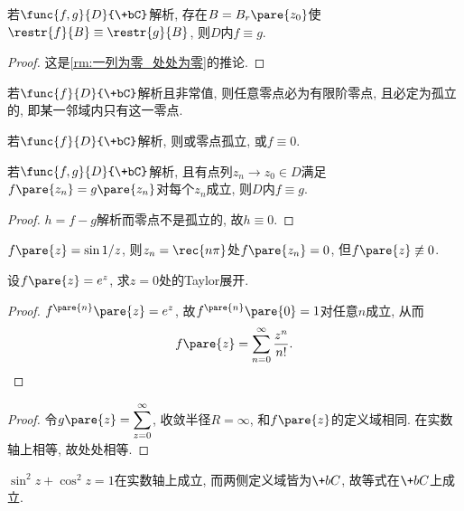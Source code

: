 \documentclass[../ComplexVariable.tex]{subfiles}
\begin{document}
\begin{corollary}
    若$\func{f,g}{D}{\+bC}$解析, 存在$B=B_r\pare{z_0}$使$\restr{f}{B} \equiv \restr{g}{B}$, 则$D$内$f\equiv g$.
\end{corollary}
\begin{proof}
    这是\cref{rm:一列为零_处处为零}的推论.
\end{proof}
\begin{corollary}
    若$\func{f}{D}{\+bC}$解析且非常值, 则任意零点必为有限阶零点, 且必定为孤立的, 即某一邻域内只有这一零点.
\end{corollary}
\begin{corollary}
    若$\func{f}{D}{\+bC}$解析, 则或零点孤立, 或$f\equiv 0$.
\end{corollary}
\begin{theorem}[唯一性定理]
    若$\func{f,g}{D}{\+bC}$解析, 且有点列$z_n\rightarrow z_0 \in D$满足$f\pare{z_n} = g\pare{z_n}$对每个$z_n$成立, 则$D$内$f\equiv g$.
\end{theorem}
\begin{proof}
    $h=f-g$解析而零点不是孤立的, 故$h\equiv 0$.
\end{proof}
\begin{sample}
    \begin{ex}
        $f\pare{z} = \sin \displaystyle 1/z$, 则$z_n = \displaystyle \rec{n\pi}$处$f\pare{z_n} = 0$, 但$f\pare{z} \not\equiv 0$.
    \end{ex}
\end{sample}
\begin{sample}
    \begin{ex}
        设$f\pare{z} = e^z$, 求$z=0$处的Taylor展开.
    \end{ex}
    \begin{proof}
        $f^{\pare{n}}\pare{z} = e^z$, 故$f^{\pare{n}}\pare{0} = 1$对任意$n$成立, 从而
        \[ f\pare{z} = \sum_{n=0}^\infty \frac{z^n}{n!}. \qedhere \]
    \end{proof}
    \begin{proof}
        令$g\pare{z} = \displaystyle \sum_{z=0}^\infty$, 收敛半径$R=\infty$, 和$f\pare{z}$的定义域相同. 在实数轴上相等, 故处处相等.
    \end{proof}
\end{sample}
\begin{sample}
    \begin{ex}
        $\sin^2 z + \cos^2 z = 1$在实数轴上成立, 而两侧定义域皆为$\+bC$, 故等式在$\+bC$上成立.
    \end{ex}
\end{sample}
\end{document}
